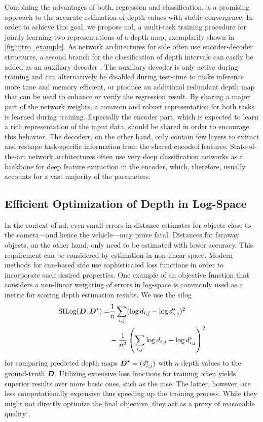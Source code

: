 \documentclass[lang=english]{tumarxivarticle}
\newcommand{\citep}{\parencite}
\begin{document}
Combining the advantages of both, regression and classification, is a promising approach to the accurate estimation of depth values with stable convergence.
In order to achieve this goal, we propose \gls{md}, a multi-task training procedure for jointly learning two representations of a depth map, exemplarily shown in \cref{fig:intro_example}.
As network architectures for \gls{side} often use encoder-decoder structures, a second branch for the classification of depth intervals can easily be added as an auxiliary decoder \citep{Liebel18,Chennupati19}.
The auxiliary decoder is only active during training and can alternatively be disabled during test-time to make inference more time and memory efficient, or produce an additional redundant depth map that can be used to enhance or verify the regression result.
By sharing a major part of the network weights, a common and robust representation for both tasks is learned during training.
Especially the encoder part, which is expected to learn a rich representation of the input data, should be shared in order to encourage this behavior.
The decoders, on the other hand, only contain few layers to extract and reshape task-specific information from the shared encoded features.
State-of-the-art network architectures often use very deep classification networks as a backbone for deep feature extraction in the encoder, which, therefore, usually accounts for a vast majority of the parameters.


\subsection{Efficient Optimization of Depth in Log-Space}

In the context of \gls{ad}, even small errors in distance estimates for objects close to the camera---and hence the vehicle---may prove fatal.
Distances for faraway objects, on the other hand, only need to be estimated with lower accuracy.
This requirement can be considered by estimation in non-linear space.
Modern methods for \gls{cnn}-based \gls{side} use sophisticated loss functions in order to incorporate such desired properties.
One example of an objective function that considers a non-linear weighting of errors in log-space \citep{Eigen14} is commonly used as a metric for scoring depth estimation results.
We use the \gls{silog}
\begin{align}
  \text{SILog}(\M{d}, \M{d}^\star) = & \frac{1}{n} \sum_{i, j} (\log{d_{i, j}} - \log{d_{i, j}^\star})^2 \nonumber \\
                             & - \frac{1}{n^2} \left( \sum_{i, j} \log{d_{i, j}} - \log{d_{i, j}^\star} \right)^2
\end{align}
for comparing predicted depth maps $\M{d}^\star = ({d^\star_{i, j}})$ with $n$ depth values to the ground-truth $\M{d}$.
Utilizing extensive loss functions for training often yields superior results over more basic ones, such as the \gls{mse}.
The latter, however, are less computationally expensive thus speeding up the training process.
While they might not directly optimize the final objective, they act as a proxy of reasonable quality \citep{Goodfellow16}.
\end{document}
